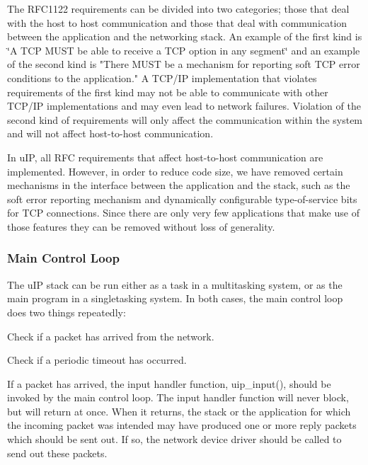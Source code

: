 The R\+F\+C1122 requirements can be divided into two categories; those that deal with the host to host communication and those that deal with communication between the application and the networking stack. An example of the first kind is \char`\"{}\+A T\+C\+P M\+U\+S\+T be able to receive a T\+C\+P
option in any segment\char`\"{} and an example of the second kind is "There M\+U\+ST be a mechanism for reporting soft T\+CP error conditions to the application." A T\+C\+P/\+IP implementation that violates requirements of the first kind may not be able to communicate with other T\+C\+P/\+IP implementations and may even lead to network failures. Violation of the second kind of requirements will only affect the communication within the system and will not affect host-\/to-\/host communication.

In u\+IP, all R\+FC requirements that affect host-\/to-\/host communication are implemented. However, in order to reduce code size, we have removed certain mechanisms in the interface between the application and the stack, such as the soft error reporting mechanism and dynamically configurable type-\/of-\/service bits for T\+CP connections. Since there are only very few applications that make use of those features they can be removed without loss of generality.\hypertarget{a00074_mainloop}{}\subsubsection{Main Control Loop}\label{a00074_mainloop}
The u\+IP stack can be run either as a task in a multitasking system, or as the main program in a singletasking system. In both cases, the main control loop does two things repeatedly\+:


\begin{DoxyItemize}
\item Check if a packet has arrived from the network.
\item Check if a periodic timeout has occurred.
\end{DoxyItemize}

If a packet has arrived, the input handler function, uip\+\_\+input(), should be invoked by the main control loop. The input handler function will never block, but will return at once. When it returns, the stack or the application for which the incoming packet was intended may have produced one or more reply packets which should be sent out. If so, the network device driver should be called to send out these packets.

